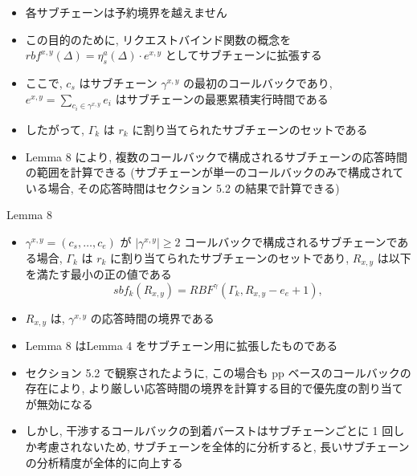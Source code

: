 \begin{frame}{}
    \begin{itemize}
        \item 各サブチェーンは予約境界を越えません
\item この目的のために, リクエストバインド関数の概念を $r b f^{x, y}(\Delta)=\eta_{s}^{a}(\Delta) \cdot e^{x, y}$ としてサブチェーンに拡張する
\item ここで, $c_{s}$ はサブチェーン $\gamma^{x, y}$ の最初のコールバックであり, $e^{x, y}=\sum_{c_{i} \in \gamma^{x, y}} e_{i}$ はサブチェーンの最悪累積実行時間である
\item したがって, $\Gamma_{k}$ は $r_{k}$ に割り当てられたサブチェーンのセットである
\item Lemma 8 により, 複数のコールバックで構成されるサブチェーンの応答時間の範囲を計算できる (サブチェーンが単一のコールバックのみで構成されている場合, その応答時間はセクション 5.2 の結果で計算できる)
    \end{itemize}
\end{frame}

\begin{frame}[label=lemma8]{Lemma 8}
    \begin{lemma}[]
        \begin{itemize}
            \item $\gamma^{x, y}=\left(c_{s}, \ldots, c_{e}\right)$ が $\left|\gamma^{x, y}\right| \geq 2$ コールバックで構成されるサブチェーンである場合, $\Gamma_{k}$ は $r_{k}$ に割り当てられたサブチェーンのセットであり, $R_{x, y}$ は以下を満たす最小の正の値である
                  \begin{equation*}
                      s b f_{k}\left(R_{x, y}\right)=R B F^{\gamma}\left(\Gamma_{k}, R_{x, y}-e_{e}+1\right),
                  \end{equation*}

            \item $R_{x, y}$ は, $\gamma^{x, y}$ の応答時間の境界である
        \end{itemize}
    \end{lemma}
\end{frame}

\begin{frame}{}
    \begin{itemize}
        \item Lemma 8 はLemma 4 をサブチェーン用に拡張したものである
\item セクション 5.2 で観察されたように, この場合も pp ベースのコールバックの存在により, より厳しい応答時間の境界を計算する目的で優先度の割り当てが無効になる
\item しかし, 干渉するコールバックの到着バーストはサブチェーンごとに 1 回しか考慮されないため, サブチェーンを全体的に分析すると, 長いサブチェーンの分析精度が全体的に向上する
    \end{itemize}
\end{frame}


